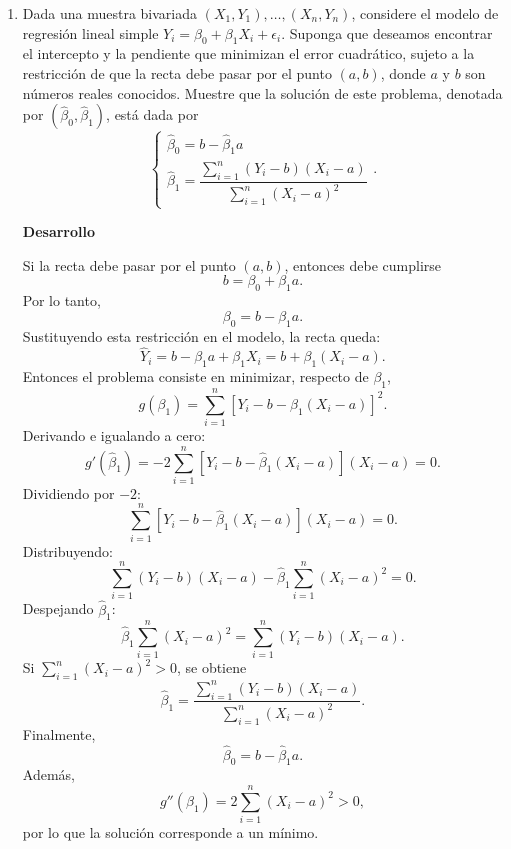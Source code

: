 \documentclass[letterpaper,11pt]{article}
\begin{document}
\begin{enumerate}
\textbf{(c)} La suma total de cuadrados es
\[
SST=\sum (Y_i-\bar{Y})^2=4,3.
\]
La suma explicada por la regresión es
\[
SSE=\sum(\hat{Y}_i-\bar{Y})^2=4,225.
\]
La suma de residuos al cuadrado es
\[
SSR=\sum \hat{u}_i^2=0,075.
\]
Dependiendo de la convención usada, algunas clases llaman $SSE$ a la suma de errores y $SSR$ a la suma explicada. En esta pauta se reportan ambas cantidades claramente: suma explicada $=4,225$ y suma residual $=0,075$.

El coeficiente de determinación es
\[
R^2=\frac{\sum(\hat{Y}_i-\bar{Y})^2}{\sum(Y_i-\bar{Y})^2}
=\frac{4,225}{4,3}=0,9826.
\]
Equivalentemente, usando $R^2=1-\frac{\sum\hat{u}_i^2}{SST}$:
\[
R^2=1-\frac{0,075}{4,3}=0,9826.
\]
\[
\boxed{R^2\approx 0,983.}
\]
Esto significa que aproximadamente el 98,3\% de la variabilidad de las notas se explica por las horas de sueño en esta muestra.

\item Dada una muestra bivariada $(X_1, Y_1), \ldots, (X_n, Y_n)$, considere el modelo de regresión lineal simple $Y_i = \beta_0 + \beta_1 X_i + \epsilon_i$. Suponga que deseamos encontrar el intercepto y la pendiente que minimizan el error cuadrático, sujeto a la restricción de que la recta debe pasar por el punto $(a,b)$, donde $a$ y $b$ son números reales conocidos. Muestre que la solución de este problema, denotada por $(\widehat{\beta}_0, \widehat{\beta}_1)$, está dada por
\[
\begin{cases}
    \widehat{\beta}_0 = b - \widehat{\beta}_1 a \\[6pt]
    \widehat{\beta}_1 = \dfrac{\sum_{i=1}^{n} (Y_i - b)(X_i - a)}{\sum_{i=1}^{n} (X_i - a)^2}
\end{cases}.
\]

\textbf{Desarrollo}

Si la recta debe pasar por el punto $(a,b)$, entonces debe cumplirse
\[
b=\beta_0+\beta_1a.
\]
Por lo tanto,
\[
\beta_0=b-\beta_1a.
\]
Sustituyendo esta restricción en el modelo, la recta queda:
\[
\hat{Y}_i=b-\beta_1a+\beta_1X_i
=b+\beta_1(X_i-a).
\]
Entonces el problema consiste en minimizar, respecto de $\beta_1$,
\[
g(\beta_1)=\sum_{i=1}^{n}\left[Y_i-b-\beta_1(X_i-a)\right]^2.
\]
Derivando e igualando a cero:
\[
g'(\widehat{\beta}_1)
=-2\sum_{i=1}^{n}\left[Y_i-b-\widehat{\beta}_1(X_i-a)\right](X_i-a)=0.
\]
Dividiendo por $-2$:
\[
\sum_{i=1}^{n}\left[Y_i-b-\widehat{\beta}_1(X_i-a)\right](X_i-a)=0.
\]
Distribuyendo:
\[
\sum_{i=1}^{n}(Y_i-b)(X_i-a)
-\widehat{\beta}_1\sum_{i=1}^{n}(X_i-a)^2=0.
\]
Despejando $\widehat{\beta}_1$:
\[
\widehat{\beta}_1\sum_{i=1}^{n}(X_i-a)^2
=\sum_{i=1}^{n}(Y_i-b)(X_i-a).
\]
Si $\sum_{i=1}^{n}(X_i-a)^2>0$, se obtiene
\[
\boxed{
\widehat{\beta}_1=
\frac{\sum_{i=1}^{n}(Y_i-b)(X_i-a)}
{\sum_{i=1}^{n}(X_i-a)^2}.
}
\]
Finalmente,
\[
\boxed{\widehat{\beta}_0=b-\widehat{\beta}_1a.}
\]
Además,
\[
g''(\beta_1)=2\sum_{i=1}^{n}(X_i-a)^2>0,
\]
por lo que la solución corresponde a un mínimo.


\end{enumerate}
\end{document}
